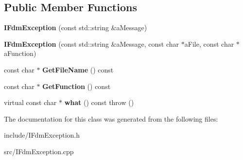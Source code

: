 \subsection*{Public Member Functions}
\begin{DoxyCompactItemize}
\item 
\hypertarget{class_f_d_m_1_1_i_fdm_exception_aa0b97aa4f09064aba907a1a1eaa18e05}{}{\bfseries I\+Fdm\+Exception} (const std\+::string \&a\+Message)\label{class_f_d_m_1_1_i_fdm_exception_aa0b97aa4f09064aba907a1a1eaa18e05}

\item 
\hypertarget{class_f_d_m_1_1_i_fdm_exception_a265f56ec39c5fc8e8688029dfc094951}{}{\bfseries I\+Fdm\+Exception} (const std\+::string \&a\+Message, const char $\ast$a\+File, const char $\ast$a\+Function)\label{class_f_d_m_1_1_i_fdm_exception_a265f56ec39c5fc8e8688029dfc094951}

\item 
\hypertarget{class_f_d_m_1_1_i_fdm_exception_ac206ea2565ff28154a4b67b95e040ff9}{}const char $\ast$ {\bfseries Get\+File\+Name} () const \label{class_f_d_m_1_1_i_fdm_exception_ac206ea2565ff28154a4b67b95e040ff9}

\item 
\hypertarget{class_f_d_m_1_1_i_fdm_exception_afc97e6861f7fb28bb4017ae3461c2dc1}{}const char $\ast$ {\bfseries Get\+Function} () const \label{class_f_d_m_1_1_i_fdm_exception_afc97e6861f7fb28bb4017ae3461c2dc1}

\item 
\hypertarget{class_f_d_m_1_1_i_fdm_exception_ab445c92ff78119abf11cd058106ebaf2}{}virtual const char $\ast$ {\bfseries what} () const   throw ()\label{class_f_d_m_1_1_i_fdm_exception_ab445c92ff78119abf11cd058106ebaf2}

\end{DoxyCompactItemize}


The documentation for this class was generated from the following files\+:\begin{DoxyCompactItemize}
\item 
include/I\+Fdm\+Exception.\+h\item 
src/I\+Fdm\+Exception.\+cpp\end{DoxyCompactItemize}
